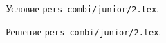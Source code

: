 \problem
Условие \texttt{pers-combi/junior/2.tex}.

\solution Решение \texttt{pers-combi/junior/2.tex}.
\endproblem
